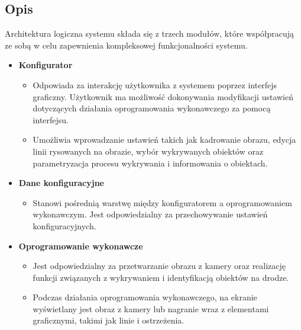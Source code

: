     \subsection{Opis}
    Architektura logiczna systemu składa się z trzech modułów, które współpracują ze sobą w celu zapewnienia 
    kompleksowej funkcjonalności systemu.

    \begin{itemize}
        \item \textbf{Konfigurator}
        \begin{itemize}
            \item Odpowiada za interakcję użytkownika z systemem poprzez interfejs graficzny. 
            Użytkownik ma możliwość dokonywania modyfikacji ustawień dotyczących działania oprogramowania
            wykonawczego za pomocą interfejsu.
            \item Umożliwia wprowadzanie ustawień takich jak kadrowanie obrazu, 
            edycja linii rysowanych na obrazie, wybór wykrywanych obiektów oraz parametryzacja 
            procesu wykrywania i informowania o obiektach.
        \end{itemize}
        
        \item \textbf{Dane konfiguracyjne}
        \begin{itemize}
            \item Stanowi pośrednią warstwę między konfiguratorem a oprogramowaniem wykonawczym. 
            Jest odpowiedzialny za przechowywanie ustawień konfiguracyjnych.
        \end{itemize}

        \item \textbf{Oprogramowanie wykonawcze}
        \begin{itemize}
            \item Jest odpowiedzialny za przetwarzanie obrazu z kamery 
            oraz realizację funkcji związanych z wykrywaniem i identyfikacją obiektów na drodze.
            \item Podczas działania oprogramowania wykonawczego, na ekranie wyświetlany jest 
            obraz z kamery lub nagranie wraz z elementami graficznymi, takimi jak linie i ostrzeżenia.
        \end{itemize}
    \end{itemize}
    

